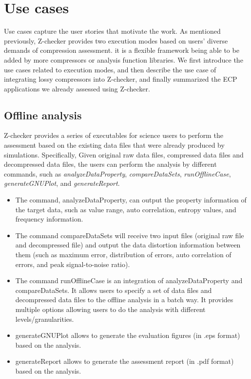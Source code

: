 \section{Use cases}

Use cases capture the user stories that motivate the work. As mentioned previously, Z-checker provides two execution modes based on users' diverse demands of compression assessment. it is a flexible framework being able to be added by more compressors or analysis function libraries. We first introduce the use cases related to execution modes, and then describe the use case of integrating lossy compressors into Z-checker, and finally summarized the ECP applications we already assessed using Z-checker. 

\subsection{Offline analysis}

Z-checker provides a series of executables for science users to perform the assessment based on the existing data files that were already produced by simulations. Specifically, Given original raw data files, compressed data files and decompressed data files, the users can perform the analysis by different commands, such as \emph{analyzeDataProperty}, \emph{compareDataSets}, \emph{runOfflineCase}, \emph{generateGNUPlot}, and \emph{generateReport}.
\begin{itemize}
  \item The command, analyzeDataProperty, can output the property information of the target data, such as value range, auto correlation, entropy values, and frequency information.
  \item The command compareDataSets will receive two input files (original raw file and decompressed file) and output the data distortion information between them (such as maximum error, distribution of errors, auto correlation of errors, and peak signal-to-noise ratio).
  \item The command runOfflineCase is an integration of analyzeDataProperty and compareDataSets. It allows users to specify a set of data files and decompressed data files to the offline analysis in a batch way. It provides multiple options allowing users to do the analysis with different levels/granularities. 
  \item generateGNUPlot allows to generate the evaluation figures (in .eps format) based on the analysis. 
  \item generateReport allows to generate the assessment report (in .pdf format) based on the analysis. 
\end{itemize}
 
